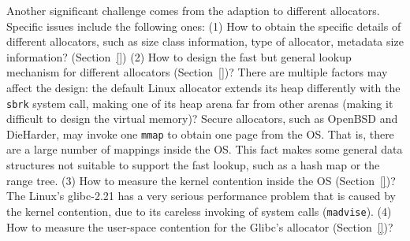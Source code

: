 Another significant challenge comes from the adaption to different allocators. Specific issues include the following ones: (1) How to obtain the specific details of different allocators, such as size class information, type of allocator, metadata size information? (Section~\ref{}) (2) How to design the fast but general lookup mechanism for different allocators (Section~\ref{})? There are multiple factors may affect the design: the default Linux allocator extends its heap differently with the \texttt{sbrk} system call, making one of its heap arena far from other arenas (making it difficult to design the virtual memory)? Secure allocators, such as OpenBSD and DieHarder, may invoke one \texttt{mmap} to obtain one page from the OS. That is, there are a large number of mappings inside the OS. This fact makes some general data structures not suitable to support the fast lookup, such as a hash map or the range tree. (3) How to measure the kernel contention inside the OS (Section~\ref{})? The Linux's glibc-2.21 has a very serious performance problem that is caused by the kernel contention, due to its careless invoking of system calls (\texttt{madvise}). (4) How to measure the user-space contention for the Glibc's allocator (Section~\ref{})? 

\begin{comment}
Challenge 2: how to perform the profiling? Similar to existing work, we majorly use the time (supported by RTDSC), the number (instrumentation-based counting), and some hardware events (PMU events) to perform the sampling. The sampling approach will be similar to existing work, but we attribute those events to the memory management events, such as allocations and deallocations. 

Challenge 3: how to reduce the performance overhead? In order to reduce the number of cache contention, we re-design our data structure to avoid false sharing and true sharing as much as possible. Also, we 

Challenge 4: we propose a novel method to evaluate the application friendliness. We evaluate the cache friendliness, or TLB friendliness. 

Challenge 5: we employs an internal allocator to avoid the interfering with allocations and deallocations of applications.  

 
\MP{} utilizes multiple methods to minimize the performance overhead of the profiling.  

\end{comment}

